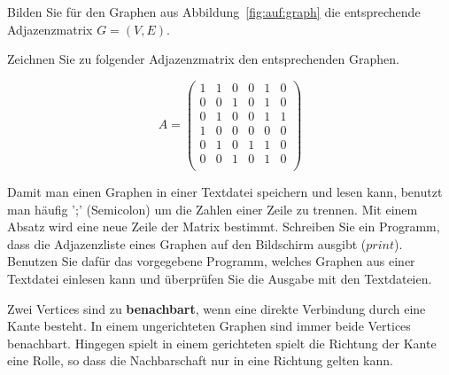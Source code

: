 \begin{aufg}
Bilden Sie für den Graphen aus Abbildung~\ref{fig:auf:graph} die entsprechende Adjazenzmatrix $G=(V,E)$.
\end{aufg}



\begin{aufg}
Zeichnen Sie zu folgender Adjazenzmatrix den entsprechenden Graphen.


\[A =  \begin{pmatrix}
  1 & 1 & 0 & 0 & 1 & 0 \\
  0 & 0 & 1 & 0 & 1 & 0 \\
  0 & 1 & 0 & 0 & 1 & 1 \\
  1 & 0 & 0 & 0 & 0 & 0 \\
  0 & 1 & 0 & 1 & 1 & 0 \\
  0 & 0 & 1 & 0 & 1 & 0 \\
 \end{pmatrix}
  \]
  
\end{aufg}

\begin{prog}
Damit man einen Graphen in einer Textdatei speichern und lesen kann, benutzt man häufig ';' (Semicolon) um die Zahlen einer Zeile zu trennen. 
Mit einem Absatz wird eine neue Zeile der Matrix bestimmt. 
Schreiben Sie ein Programm, dass die Adjazenzliste eines Graphen auf den Bildschirm ausgibt ($print$).
Benutzen Sie dafür das vorgegebene Programm, welches Graphen aus einer Textdatei einlesen kann und überprüfen Sie die Ausgabe mit den Textdateien.
\end{prog}


\begin{mdef}
Zwei Vertices sind zu \textbf{benachbart}, wenn eine direkte Verbindung durch eine Kante besteht. 
In einem ungerichteten Graphen sind immer beide Vertices benachbart. 
Hingegen spielt in einem gerichteten spielt die Richtung der Kante eine Rolle, so dass die Nachbarschaft nur in eine Richtung gelten kann.
\end{mdef}

